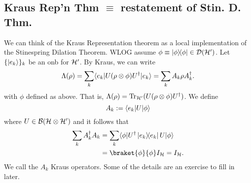 \subsection*{Kraus Rep'n Thm $\equiv$ restatement of Stin. D. Thm.}
We can think of the Kraus Representation theorem as a local implementation of the Stinespring Dilation Theorem. WLOG assume $\phi\equiv \left\lvert \phi \middle\rangle\!\middle\langle \phi \right\rvert \in \mathcal{D}(\mathcal H')$. Let $\{\lvert e_k\rangle\}_k$ be an onb for $\mathcal H'$. By Kraus, we can write
\begin{equation}
    \Lambda(\rho)=\sum_k \langle e_k\rvert U(\rho\otimes \phi) U^\dagger \lvert e_k\rangle=\sum_k A_k \rho A_k^\dagger.
\end{equation}
with $\phi$ defined as above. That is, $\Lambda(\rho)=\operatorname{Tr}_{\mathcal H'}(U(\rho \otimes \phi)U^\dagger)$. We define
\begin{equation}
    A_k:= \langle e_k\rvert U \lvert\phi\rangle
\end{equation}
where $U\in \mathcal{B}(\mathcal H \otimes \mathcal H')$ and it follows that
\begin{align*}
    \sum_k A_k^\dagger A_k &= \sum_k \bra{\phi}U^\dagger \kb{e_k}{e_k} U \ket{\phi}\\
    &= \braket{\phi}{\phi}I_{\cH} = I_{\cH}.
\end{align*}
We call the $A_k$ Kraus operators. Some of the details are an exercise to fill in later.

